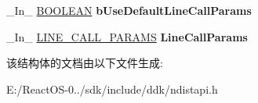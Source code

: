 \begin{DoxyCompactItemize}
\mbox{\label{struct___n_d_i_s___t_a_p_i___m_a_k_e___c_a_l_l_a7fe9998b13eeee661f21658f5990d87f}} 
\+\_\+\+In\+\_\+ \hyperlink{_processor_bind_8h_a112e3146cb38b6ee95e64d85842e380a}{B\+O\+O\+L\+E\+AN} {\bfseries b\+Use\+Default\+Line\+Call\+Params}
\item 
\mbox{\label{struct___n_d_i_s___t_a_p_i___m_a_k_e___c_a_l_l_a04a13ec03b000aba1ecdce19848a066e}} 
\+\_\+\+In\+\_\+ \hyperlink{struct___l_i_n_e___c_a_l_l___p_a_r_a_m_s}{L\+I\+N\+E\+\_\+\+C\+A\+L\+L\+\_\+\+P\+A\+R\+A\+MS} {\bfseries Line\+Call\+Params}
\end{DoxyCompactItemize}


该结构体的文档由以下文件生成\+:\begin{DoxyCompactItemize}
\item 
E\+:/\+React\+O\+S-\/0../sdk/include/ddk/ndistapi.\+h\end{DoxyCompactItemize}
